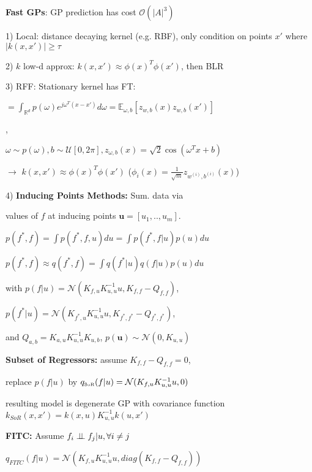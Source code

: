 


\textbf{Fast GPs}: GP prediction has cost $\mathcal{O}(|A|^3)$

1) \; Local: distance decaying kernel (e.g. RBF), only condition on points $x'$ where $|k(x,x')| \geq \tau$

2) \; $k$ low-d approx: $k(x,x') \approx \phi(x)^T \phi(x')$, then BLR

3) \; RFF: Stationary kernel has FT: \;  

$= \int_{\mathbb{R}^d} p(\omega) e^{j \omega^T (x - x')} d\omega = \mathbb{E}_{\omega, b}[z_{w,b}(x) z_{w,b}(x')]$ 

,

$\omega \sim p(\omega), b \sim \mathcal{U}[0, 2\pi], z_{\omega, b}(x) = \sqrt{2} \cos(\omega^T x + b)$


$\rightarrow$ $k(x,x') \approx \phi(x)^T \phi(x')$ ($\phi_i(x) = \frac{1}{\sqrt{m}} z_{w^{(i)},b^{(i)}}(x)$)

4) \; \textbf{Inducing Points Methods:} \; Sum. data via

values of $f$ at inducing points $\mathbf{u} = [u_1,..,u_m]$.

$p(f^*, f) = \int p(f^*, f, u) du = \int p(f^*, f | u) p(u) du$

$p(f^*, f) \approx q(f^*, f) = \int q(f^* | u) q(f | u) p(u) du$

with $p(f | u) = \mathcal{N}(K_{f,u} K_{u,u}^{-1} u, K_{f,f} - Q_{f,f} )$,

$p(f^* | u) = \mathcal{N}(K_{f^*,u} K_{u,u}^{-1} u, K_{f^*, f^*} - Q_{f^*, f^*})$,

and $Q_{a,b} = K_{a,u} K_{u,u}^{-1} K_{u,b}$, $p(\mathbf{u}) \sim \mathcal{N}(0, K_{u,u})$

\textbf{Subset of Regressors:} \; assume $K_{f,f} - Q_{f,f} = 0$,

replace $p(f|u)$ by $q_{\text{\tiny SoR}}(f|u) = \mathcal{N}(K_{f,u} K_{u,u}^{-1} u,0)$

resulting model is degenerate GP with covariance function $k_{SoR}(x,x') = k(x,u) K_{u,u}^{-1} k(u, x')$

\textbf{FITC:} \; Assume $f_i \perp\!\!\!\perp f_j | u, \forall i \neq j$

\vspace*{-1mm}
$q_{FITC}(f | u) = \mathcal{N}(K_{f,u} K_{u,u}^{-1} u, diag(K_{f,f} - Q_{f,f}))$


